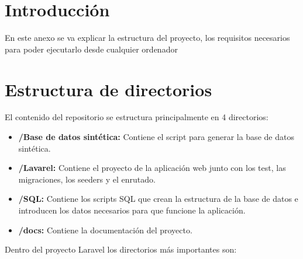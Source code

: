 
\section{Introducción}

En este anexo se va explicar la estructura del proyecto, los requisitos necesarios para poder ejecutarlo desde cualquier ordenador  

\section{Estructura de directorios}

El contenido del repositorio se estructura principalmente en 4 directorios:

\begin{itemize}
    \item \textbf{/Base de datos sintética:} Contiene el script para generar la base de datos sintética.
    \item \textbf{/Lavarel:} Contiene el proyecto de la aplicación web junto con los test, las migraciones, los seeders y el enrutado.
    \item \textbf{/SQL:} Contiene los scripts SQL que crean la estructura de la base de datos e introducen los datos necesarios para que funcione la aplicación.
    \item \textbf{/docs:} Contiene la documentación del proyecto. 
\end{itemize}

Dentro del proyecto Laravel los directorios más importantes son:

